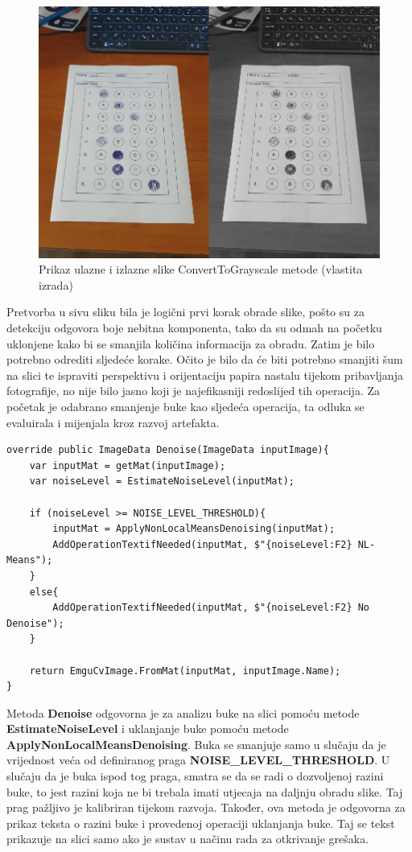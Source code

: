 \documentclass{foi}
\begin{document}
\begin{figure}[H]
\centering
\includegraphics[width=0.8\linewidth]{slike/ToGrayscale.png}
\caption{Prikaz ulazne i izlazne slike ConvertToGrayscale metode (vlastita izrada)}
\end{figure}

Pretvorba u sivu sliku bila je logični prvi korak obrade slike, pošto su za detekciju odgovora boje nebitna komponenta, tako da su odmah na početku uklonjene kako bi se smanjila količina informacija za obradu. Zatim je bilo potrebno odrediti sljedeće korake. Očito je bilo da će biti potrebno smanjiti šum na slici te ispraviti perspektivu i orijentaciju papira nastalu tijekom pribavljanja fotografije, no nije bilo jasno koji je najefikasniji redoslijed tih operacija. Za početak je odabrano smanjenje buke kao sljedeća operacija, ta odluka se evaluirala i mijenjala kroz razvoj artefakta.

\begin{lstlisting}[caption={Metoda za smanjenje buke na slici}]
override public ImageData Denoise(ImageData inputImage){
    var inputMat = getMat(inputImage);
    var noiseLevel = EstimateNoiseLevel(inputMat);

    if (noiseLevel >= NOISE_LEVEL_THRESHOLD){
        inputMat = ApplyNonLocalMeansDenoising(inputMat);
        AddOperationTextifNeeded(inputMat, $"{noiseLevel:F2} NL-Means");
    }
    else{
        AddOperationTextifNeeded(inputMat, $"{noiseLevel:F2} No Denoise");
    }

    return EmguCvImage.FromMat(inputMat, inputImage.Name);
}
\end{lstlisting}

Metoda \textbf{Denoise} odgovorna je za analizu buke na slici pomoću metode \textbf{EstimateNoiseLevel} i uklanjanje buke pomoću metode \textbf{ApplyNonLocalMeansDenoising}. Buka se smanjuje samo u slučaju da je vrijednost veća od definiranog praga \textbf{NOISE\_LEVEL\_THRESHOLD}. U slučaju da je buka ispod tog praga, smatra se da se radi o dozvoljenoj razini buke, to jest razini koja ne bi trebala imati utjecaja na daljnju obradu slike. Taj prag pažljivo je kalibriran tijekom razvoja. Također, ova metoda je odgovorna za prikaz teksta o razini buke i provedenoj operaciji uklanjanja buke. Taj se tekst prikazuje na slici samo ako je sustav u načinu rada za otkrivanje grešaka.
\end{document}
